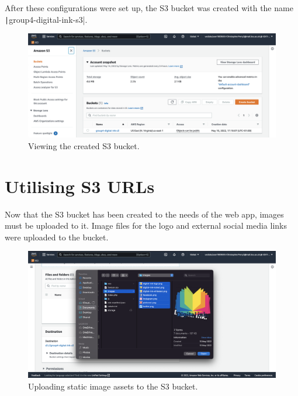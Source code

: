 After these configurations were set up, the S3 bucket was created with the name \texttt|group4-digital-ink-s3|.

\begin{figure}[!htbp]
    \centering
    \includegraphics[width=125mm]{resources/s3/s3-created}
    \caption{Viewing the created S3 bucket.}
    \label{fig:s3-created}
\end{figure}

\pagebreak
\section{Utilising S3 URLs}
Now that the S3 bucket has been created to the needs of the web app, images must be uploaded to it.
Image files for the  logo and external social media links were uploaded to the bucket.

\begin{figure}[!htbp]
    \centering
    \includegraphics[width=\textwidth]{resources/s3/s3-image-upload}
    \caption{Uploading static image assets to the S3 bucket.}
    \label{fig:s3-image-upload}
\end{figure}


